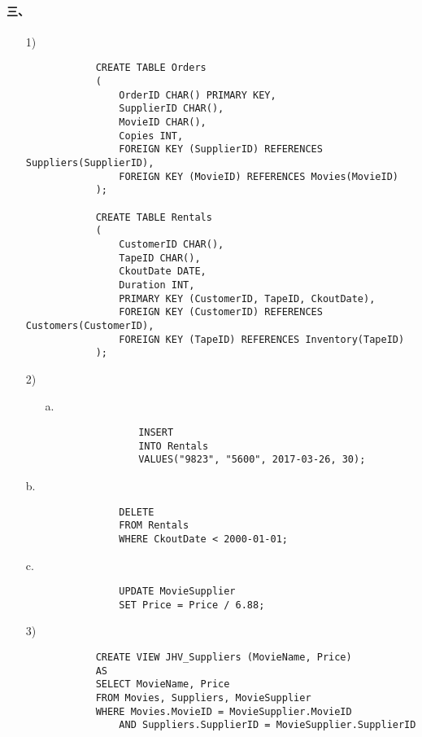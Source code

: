 \documentclass[10pt,a4paper]{article}
\begin{document}
    \paragraph{三、}
    \begin{enumerate}
        \item[1)]\begin{verbatim}
            CREATE TABLE Orders
            (
                OrderID CHAR() PRIMARY KEY,
                SupplierID CHAR(), 
                MovieID CHAR(),
                Copies INT,
                FOREIGN KEY (SupplierID) REFERENCES Suppliers(SupplierID),
                FOREIGN KEY (MovieID) REFERENCES Movies(MovieID)
            );

            CREATE TABLE Rentals
            (
                CustomerID CHAR(),
                TapeID CHAR(),
                CkoutDate DATE,
                Duration INT,
                PRIMARY KEY (CustomerID, TapeID, CkoutDate),
                FOREIGN KEY (CustomerID) REFERENCES Customers(CustomerID),
                FOREIGN KEY (TapeID) REFERENCES Inventory(TapeID)
            );
        \end{verbatim}
        \item[2)]\begin{enumerate}
            \item[a.]\begin{verbatim}
                INSERT
                INTO Rentals
                VALUES("9823", "5600", 2017-03-26, 30);
            \end{verbatim}
        \end{enumerate}
            \item[b.]\begin{verbatim}
                DELETE
                FROM Rentals
                WHERE CkoutDate < 2000-01-01;
            \end{verbatim}
            \item[c.]\begin{verbatim}
                UPDATE MovieSupplier
                SET Price = Price / 6.88;
            \end{verbatim}
        \item[3)]\begin{verbatim}
            CREATE VIEW JHV_Suppliers (MovieName, Price)
            AS
            SELECT MovieName, Price
            FROM Movies, Suppliers, MovieSupplier
            WHERE Movies.MovieID = MovieSupplier.MovieID
                AND Suppliers.SupplierID = MovieSupplier.SupplierID

\end{verbatim}
\end{enumerate}
\end{document}
